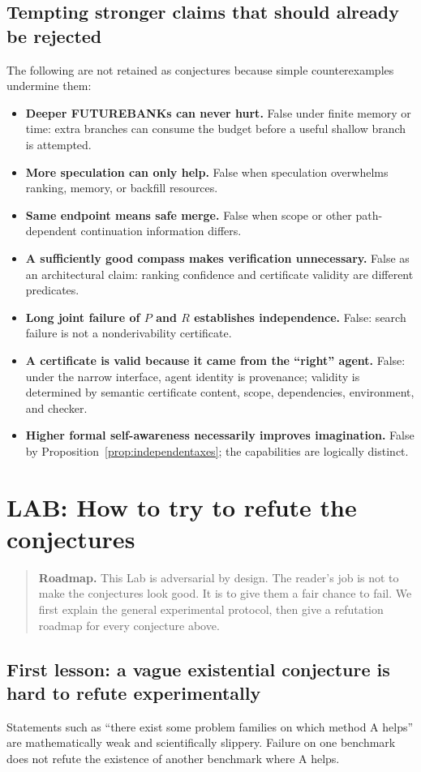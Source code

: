 \documentclass[11pt,openany]{book}
\theoremstyle{definition}
\theoremstyle{remark}
\newenvironment{roadmap}{\begin{quote}\small\color{deepblue}\textbf{Roadmap.} }{\end{quote}}
\begin{document}
\section{Tempting stronger claims that should already be rejected}
The following are not retained as conjectures because simple counterexamples undermine them:
\begin{itemize}
\item \textbf{Deeper FUTUREBANKs can never hurt.} False under finite memory or time: extra branches can consume the budget before a useful shallow branch is attempted.
\item \textbf{More speculation can only help.} False when speculation overwhelms ranking, memory, or backfill resources.
\item \textbf{Same endpoint means safe merge.} False when scope or other path-dependent continuation information differs.
\item \textbf{A sufficiently good compass makes verification unnecessary.} False as an architectural claim: ranking confidence and certificate validity are different predicates.
\item \textbf{Long joint failure of $P$ and $R$ establishes independence.} False: search failure is not a nonderivability certificate.
\item \textbf{A certificate is valid because it came from the ``right'' agent.} False: under the narrow interface, agent identity is provenance; validity is determined by semantic certificate content, scope, dependencies, environment, and checker.
\item \textbf{Higher formal self-awareness necessarily improves imagination.} False by Proposition~\ref{prop:independentaxes}; the capabilities are logically distinct.
\end{itemize}

\chapter{LAB: How to try to refute the conjectures}
\begin{roadmap}
This Lab is adversarial by design. The reader's job is not to make the conjectures look good. It is to give them a fair chance to fail. We first explain the general experimental protocol, then give a refutation roadmap for every conjecture above.
\end{roadmap}

\section{First lesson: a vague existential conjecture is hard to refute experimentally}
Statements such as ``there exist some problem families on which method A helps'' are mathematically weak and scientifically slippery. Failure on one benchmark does not refute the existence of another benchmark where A helps.
\end{document}
